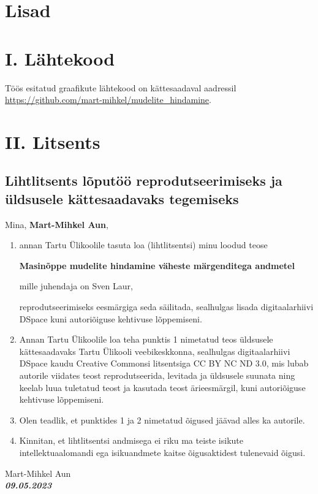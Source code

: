 \section*{Lisad}

\section*{I. Lähtekood}
Töös esitatud graafikute lähtekood on kättesaadaval aadressil \url{https://github.com/mart-mihkel/mudelite_hindamine}.

\newpage
\section*{II. Litsents}
\subsection*{Lihtlitsents lõputöö reprodutseerimiseks ja üldsusele kättesaadavaks tegemiseks}
Mina, \textbf{Mart-Mihkel Aun}, 
\begin{enumerate}
    \item
    annan Tartu Ülikoolile tasuta loa (lihtlitsentsi) minu loodud teose
    \par
    \textbf{Masinõppe mudelite hindamine väheste märgenditega andmetel}
    \par
    mille juhendaja on Sven Laur,
    \par
    reprodutseerimiseks eesmärgiga seda säilitada, sealhulgas lisada digitaalarhiivi DSpace kuni autoriõiguse kehtivuse lõppemiseni.
    \par
    \item

    Annan Tartu Ülikoolile loa teha punktis 1 nimetatud teos üldsusele kättesaadavaks Tartu Ülikooli veebikeskkonna, sealhulgas digitaalarhiivi DSpace kaudu Creative Commonsi litsentsiga CC BY NC ND 3.0, mis lubab autorile viidates teost reprodutseerida, levitada ja üldsusele suunata ning keelab luua tuletatud teost ja kasutada teost ärieesmärgil, kuni autoriõiguse kehtivuse lõppemiseni.
    \item
    Olen teadlik, et punktides 1 ja 2 nimetatud õigused jäävad alles ka autorile.
    \item
    Kinnitan, et lihtlitsentsi andmisega ei riku ma teiste isikute intellektuaalomandi ega isikuandmete kaitse õigusaktidest tulenevaid õigusi. 
\end{enumerate}
\noindent
Mart-Mihkel Aun\\
\textbf{\textsl{09.05.2023}}